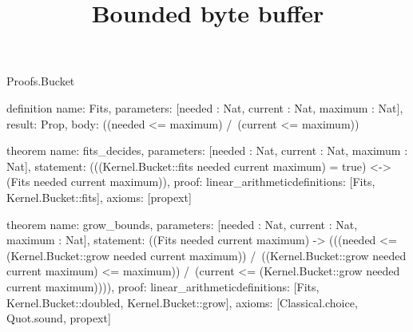 \begin{lexlean}{Proofs.Bucket}
\title{Bounded byte buffer}
\begin{semanticmodule}
definition{
  name: Fits,
  parameters: [needed : Nat, current : Nat, maximum : Nat],
  result: Prop,
  body: ((needed <= maximum) /\ (current <= maximum))
}

theorem{
  name: fits_decides,
  parameters: [needed : Nat, current : Nat, maximum : Nat],
  statement: (((Kernel.Bucket::fits needed current maximum) = true) <-> (Fits needed current maximum)),
  proof: linear_arithmetic{definitions: [Fits, Kernel.Bucket::fits]},
  axioms: [propext]
}

theorem{
  name: grow_bounds,
  parameters: [needed : Nat, current : Nat, maximum : Nat],
  statement: ((Fits needed current maximum) -> (((needed <= (Kernel.Bucket::grow needed current maximum)) /\ ((Kernel.Bucket::grow needed current maximum) <= maximum)) /\ (current <= (Kernel.Bucket::grow needed current maximum)))),
  proof: linear_arithmetic{definitions: [Fits, Kernel.Bucket::doubled, Kernel.Bucket::grow]},
  axioms: [Classical.choice, Quot.sound, propext]
}
\end{semanticmodule}
\end{lexlean}
